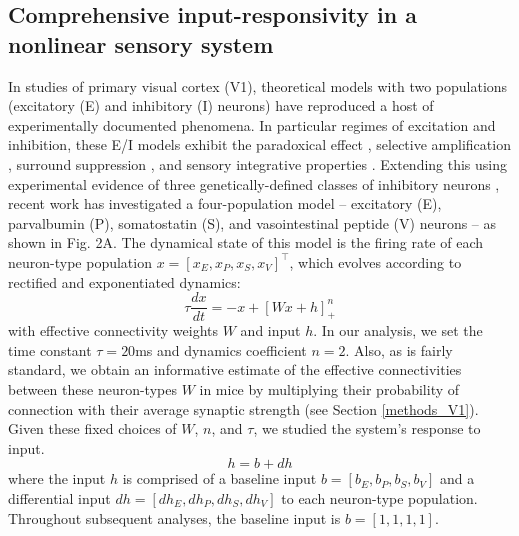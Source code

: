 \documentclass[11pt]{article}
\begin{document}
\subsection{Comprehensive input-responsivity in a nonlinear sensory system} \label{results_V1}
In studies of primary visual cortex (V1), theoretical models with two populations (excitatory (E) and inhibitory (I) neurons) have reproduced a host of experimentally documented phenomena. 
  In particular regimes of excitation and inhibition, these E/I models exhibit the paradoxical effect \cite{tsodyks1997paradoxical}, selective amplification \cite{murphy2009balanced}, surround suppression \cite{ozeki2009inhibitory}, and  sensory integrative properties \cite{rubin2015stabilized}.  
 Extending this using experimental evidence of three genetically-defined classes of inhibitory neurons \cite{markram2004interneurons, rudy2011three}, recent work \cite{litwin2016inhibitory} has investigated a four-population model --  excitatory (E), parvalbumin (P), somatostatin (S), and vasointestinal peptide (V) neurons -- as shown in Fig. 2A.
 The dynamical state of this model is the firing rate of each neuron-type population $x = \left[x_E, x_P , x_S, x_V \right]^\top$, which evolves according to rectified and exponentiated dynamics:
%
\begin{equation}
\tau \frac{dx}{dt} = -x + [W x+ h]_+^n
\end{equation}
%
with effective connectivity weights $W$ and input $h$.  In our analysis, we set the time constant $\tau = 20$ms and dynamics coefficient $n = 2$.  
Also, as is fairly standard, we obtain an informative estimate of the effective connectivities between these neuron-types $W$ in mice by multiplying their probability of connection with their average synaptic strength \cite{allen} (see Section \ref{methods_V1}).
Given these fixed choices of $W$, $n$, and $\tau$, we studied the system's response to input.
\begin{equation}
h = b + dh
\end{equation} 
where the input $h$ is comprised of a baseline input $b = \left[ b_E, b_P , b_S , b_V \right]$ and a differential input $dh = \left[ dh_E , dh_P , dh_S , dh_V\right]$ to each neuron-type population.  Throughout subsequent analyses, the baseline input is $b = \left[ 1 ,1,1,1\right]$. 
\end{document}
